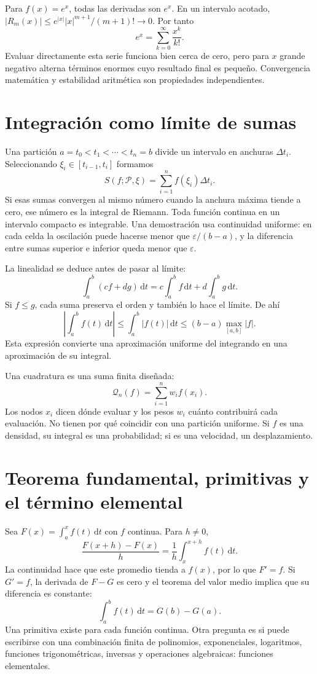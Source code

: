 \documentclass[11pt,a4paper]{article}
\newcommand{\dd}{\,\mathrm d}
\theoremstyle{definition}
\newcommand{\eps}{\varepsilon}
\begin{document}
Para $f(x)=e^x$, todas las derivadas son $e^x$. En un intervalo acotado, $|R_m(x)|\le e^{|x|}|x|^{m+1}/(m+1)!\to0$. Por tanto
\[
e^x=\sum_{k=0}^\infty\frac{x^k}{k!}.
\]
Evaluar directamente esta serie funciona bien cerca de cero, pero para $x$ grande negativo alterna términos enormes cuyo resultado final es pequeño. Convergencia matemática y estabilidad aritmética son propiedades independientes.

\section{Integración como límite de sumas}
Una partición $a=t_0<t_1<\cdots<t_n=b$ divide un intervalo en anchuras $\Delta t_i$. Seleccionando $\xi_i\in[t_{i-1},t_i]$ formamos
\[
S(f;\mathcal P,\xi)=\sum_{i=1}^n f(\xi_i)\Delta t_i.
\]
Si esas sumas convergen al mismo número cuando la anchura máxima tiende a cero, ese número es la integral de Riemann. Toda función continua en un intervalo compacto es integrable. Una demostración usa continuidad uniforme: en cada celda la oscilación puede hacerse menor que $\eps/(b-a)$, y la diferencia entre sumas superior e inferior queda menor que $\eps$.

La linealidad se deduce antes de pasar al límite:
\[
\int_a^b(cf+dg)\dd t=c\int_a^b f\dd t+d\int_a^b g\dd t.
\]
Si $f\le g$, cada suma preserva el orden y también lo hace el límite. De ahí
\[
\left|\int_a^b f(t)\dd t\right|\le\int_a^b|f(t)|\dd t
\le(b-a)\max_{[a,b]}|f|.
\]
Esta expresión convierte una aproximación uniforme del integrando en una aproximación de su integral.

Una cuadratura es una suma finita diseñada:
\[
\mathcal Q_n(f)=\sum_{i=1}^n w_i f(x_i).
\]
Los nodos $x_i$ dicen dónde evaluar y los pesos $w_i$ cuánto contribuirá cada evaluación. No tienen por qué coincidir con una partición uniforme. Si $f$ es una densidad, su integral es una probabilidad; si es una velocidad, un desplazamiento.

\section{Teorema fundamental, primitivas y el término elemental}
Sea $F(x)=\int_a^x f(t)\dd t$ con $f$ continua. Para $h\ne0$,
\[
\frac{F(x+h)-F(x)}h=\frac1h\int_x^{x+h}f(t)\dd t.
\]
La continuidad hace que este promedio tienda a $f(x)$, por lo que $F'=f$. Si $G'=f$, la derivada de $F-G$ es cero y el teorema del valor medio implica que su diferencia es constante:
\[
\int_a^b f(t)\dd t=G(b)-G(a).
\]
Una primitiva existe para cada función continua. Otra pregunta es si puede escribirse con una combinación finita de polinomios, exponenciales, logaritmos, funciones trigonométricas, inversas y operaciones algebraicas: funciones elementales.
\end{document}
